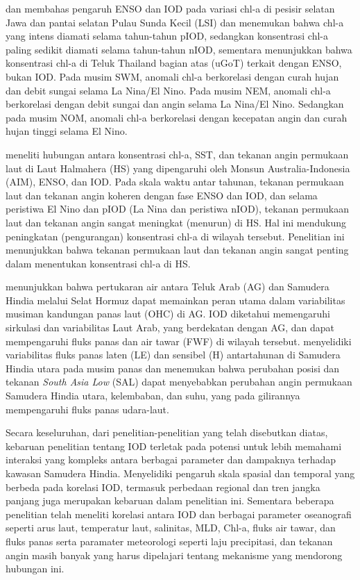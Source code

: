 \begin{spacing}{1.5}
	 dan  membahas pengaruh ENSO dan IOD pada variasi chl-a di pesisir selatan Jawa dan pantai selatan Pulau Sunda Kecil (LSI) dan menemukan bahwa chl-a yang intens diamati selama tahun-tahun pIOD, sedangkan konsentrasi chl-a paling sedikit diamati selama tahun-tahun nIOD, sementara  menunjukkan bahwa konsentrasi chl-a di Teluk Thailand bagian atas (uGoT) terkait dengan ENSO, bukan IOD. Pada musim SWM, anomali chl-a berkorelasi dengan curah hujan dan debit sungai selama La Nina/El Nino. Pada musim NEM, anomali chl-a berkorelasi dengan debit sungai dan angin selama La Nina/El Nino. Sedangkan pada musim NOM, anomali chl-a berkorelasi dengan kecepatan angin dan curah hujan tinggi selama El Nino.
	
	 meneliti hubungan antara konsentrasi chl-a, SST, dan tekanan angin permukaan laut di Laut Halmahera (HS) yang dipengaruhi oleh Monsun Australia-Indonesia (AIM), ENSO, dan IOD. Pada skala waktu antar tahunan, tekanan permukaan laut dan tekanan angin koheren dengan fase ENSO dan IOD, dan selama peristiwa El Nino dan pIOD (La Nina dan peristiwa nIOD), tekanan permukaan laut dan tekanan angin sangat meningkat (menurun) di HS. Hal ini mendukung peningkatan (pengurangan) konsentrasi chl-a di wilayah tersebut. Penelitian ini menunjukkan bahwa tekanan permukaan laut dan tekanan angin sangat penting dalam menentukan konsentrasi chl-a di HS.
	
	 menunjukkan bahwa pertukaran air antara Teluk Arab (AG) dan Samudera Hindia melalui Selat Hormuz dapat memainkan peran utama dalam variabilitas musiman kandungan panas laut (OHC) di AG. IOD diketahui memengaruhi sirkulasi dan variabilitas Laut Arab, yang berdekatan dengan AG, dan dapat mempengaruhi fluks panas dan air tawar (FWF) di wilayah tersebut.   menyelidiki variabilitas fluks panas laten (LE) dan sensibel (H) antartahunan di Samudera Hindia utara pada musim panas dan menemukan bahwa perubahan posisi dan tekanan \textit{South Asia Low} (SAL) dapat menyebabkan perubahan angin permukaan Samudera Hindia utara, kelembaban, dan suhu, yang pada gilirannya mempengaruhi fluks panas udara-laut.
	
	Secara keseluruhan, dari penelitian-penelitian yang telah disebutkan diatas, kebaruan penelitian tentang IOD terletak pada potensi untuk lebih memahami interaksi yang kompleks antara berbagai parameter dan dampaknya terhadap kawasan Samudera Hindia. Menyelidiki pengaruh skala spasial dan temporal yang berbeda pada korelasi IOD, termasuk perbedaan regional dan tren jangka panjang juga merupakan kebaruan dalam penelitian ini. Sementara beberapa penelitian telah meneliti korelasi antara IOD dan berbagai parameter oseanografi seperti arus laut, temperatur laut, salinitas, MLD, Chl-a, fluks air tawar, dan fluks panas serta paramater meteorologi seperti laju precipitasi, dan tekanan angin masih banyak yang harus dipelajari tentang mekanisme yang mendorong hubungan ini.
	
\end{spacing}
\vspace{-1pc}
